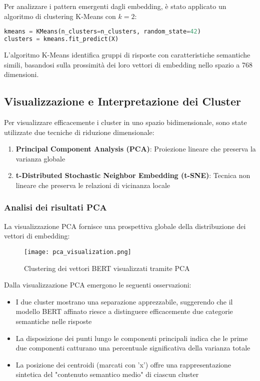 \documentclass{article}
\begin{document}
Per analizzare i pattern emergenti dagli embedding, è stato applicato un algoritmo di clustering K-Means con \(k=2\):

\begin{lstlisting}[language=Python]
kmeans = KMeans(n_clusters=n_clusters, random_state=42)
clusters = kmeans.fit_predict(X)
\end{lstlisting}

L'algoritmo K-Means identifica gruppi di risposte con caratteristiche semantiche simili, basandosi sulla prossimità dei loro vettori di embedding nello spazio a 768 dimensioni.

\subsection{Visualizzazione e Interpretazione dei Cluster}

Per visualizzare efficacemente i cluster in uno spazio bidimensionale, sono state utilizzate due tecniche di riduzione dimensionale:

\begin{enumerate}
    \item \textbf{Principal Component Analysis (PCA)}: Proiezione lineare che preserva la varianza globale
    \item \textbf{t-Distributed Stochastic Neighbor Embedding (t-SNE)}: Tecnica non lineare che preserva le relazioni di vicinanza locale
\end{enumerate}

\subsubsection{Analisi dei risultati PCA}

La visualizzazione PCA fornisce una prospettiva globale della distribuzione dei vettori di embedding:

\begin{figure}[h]
    \centering
    \texttt{[image: pca\_visualization.png]}
    \caption{Clustering dei vettori BERT visualizzati tramite PCA}
    \label{fig:pca}
\end{figure}

Dalla visualizzazione PCA emergono le seguenti osservazioni:

\begin{itemize}
    \item I due cluster mostrano una separazione apprezzabile, suggerendo che il modello BERT affinato riesce a distinguere efficacemente due categorie semantiche nelle risposte
    \item La disposizione dei punti lungo le componenti principali indica che le prime due componenti catturano una percentuale significativa della varianza totale
    \item La posizione dei centroidi (marcati con 'x') offre una rappresentazione sintetica del "contenuto semantico medio" di ciascun cluster
\end{itemize}
\end{document}
